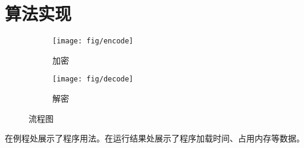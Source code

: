 \documentclass[../main]{subfiles}
\begin{document}
\chapter{算法实现}%
\label{cha:realize}

\begin{figure}[htbp]
  \centering
  \begin{subfigure}[htbp]{0.45\linewidth}
    \centering
    \texttt{[image: fig/encode]}
  \caption{加密}%
  \label{fig:encode}
  \end{subfigure}
  \quad
  \begin{subfigure}[htbp]{0.45\linewidth}
    \centering
    \texttt{[image: fig/decode]}
  \caption{解密}%
  \label{fig:decode}
  \end{subfigure}
    \caption{流程图}%
    \label{fig:dia}
\end{figure}

\begin{Answer}
  在例程处展示了程序用法。在运行结果处展示了程序加载时间、占用内存等数据。
\end{Answer}

\end{document}
